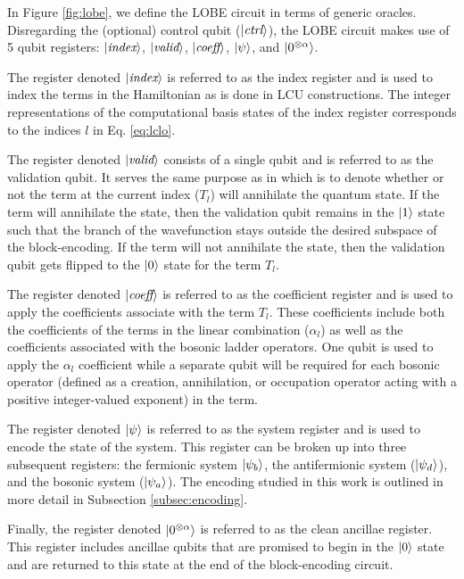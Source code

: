 In Figure \ref{fig:lobe}, we define the LOBE circuit in terms of generic oracles.
Disregarding the (optional) control qubit ($\ket{\textit{ctrl}}$), the LOBE circuit makes use of 5 qubit registers: $\ket{\textit{index}}$, $\ket{\textit{valid}}$, $\ket{\textit{coeff}}$, $\ket{\psi}$, and $\ket{0^{\otimes \alpha}}$.

The register denoted $\ket{\textit{index}}$ is referred to as the index register and is used to index the terms in the Hamiltonian as is done in LCU constructions. 
The integer representations of the computational basis states of the index register corresponds to the indices $l$ in Eq. \ref{eq:lclo}. 

The register denoted $\ket{\textit{valid}}$ consists of a single qubit and is referred to as the validation qubit.
It serves the same purpose as in \cite{liu2024efficient} which is to denote whether or not the term at the current index ($T_l$) will annihilate the quantum state.
If the term will annihilate the state, then the validation qubit remains in the $\ket{1}$ state such that the branch of the wavefunction stays outside the desired subspace of the block-encoding.
If the term will not annihilate the state, then the validation qubit gets flipped to the $\ket{0}$ state for the term $T_l$.

The register denoted $\ket{\textit{coeff}}$ is referred to as the coefficient register and is used to apply the coefficients associate with the term $T_l$. 
These coefficients include both the coefficients of the terms in the linear combination ($\alpha_l$) as well as the coefficients associated with the bosonic ladder operators.
One qubit is used to apply the $\alpha_l$ coefficient while a separate qubit will be required for each bosonic operator (defined as a creation, annihilation, or occupation operator acting with a positive integer-valued exponent) in the term.

The register denoted $\ket{\psi}$ is referred to as the system register and is used to encode the state of the system.
This register can be broken up into three subsequent registers: the fermionic system $\ket{\psi_b}$, the antifermionic system ($\ket{\psi_d}$), and the bosonic system ($\ket{\psi_a}$).
The encoding studied in this work is outlined in more detail in Subsection \ref{subsec:encoding}.

Finally, the register denoted $\ket{0^{\otimes \alpha}}$ is referred to as the clean ancillae register.
This register includes ancillae qubits that are promised to begin in the $\ket{0}$ state and are returned to this state at the end of the block-encoding circuit.

